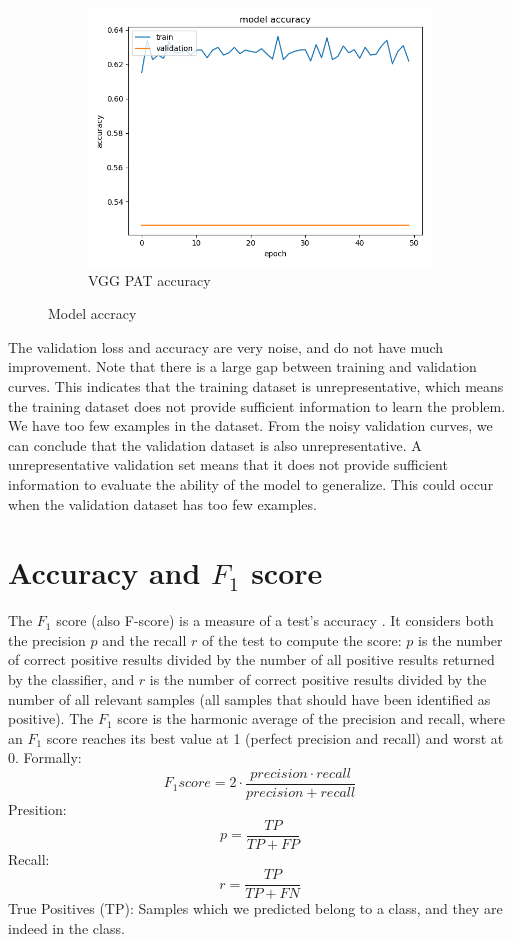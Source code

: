 \begin{figure}[h]
\begin{subfigure}[b]{.3\linewidth}
\includegraphics[width=\linewidth]{Figs/vgg_pat_acc.jpg}
\caption{VGG PAT accuracy}
\end{subfigure}
\caption{Model accracy}
\label{fig:acc}
\end{figure}

The validation loss and accuracy are very noise, and do not have much improvement. Note that there is a large gap between training and validation curves. This indicates that the training dataset is unrepresentative, which means the training dataset does not provide sufficient information to learn the problem. We have too few examples in the dataset. From the noisy validation curves, we can conclude that the validation dataset is also unrepresentative. A  unrepresentative validation set means that it does not provide sufficient information to evaluate the ability of the model to generalize. This could occur when the validation dataset has too few examples.

\section{Accuracy and $F_1$ score}
The $F_1$ score (also F-score) is a measure of a test's accuracy \citep{powers2011evaluation}. It considers both the precision $p$ and the recall $r$ of the test to compute the score: $p$ is the number of correct positive results divided by the number of all positive results returned by the classifier, and $r$ is the number of correct positive results divided by the number of all relevant samples (all samples that should have been identified as positive). The $F_1$ score is the harmonic average of the precision and recall, where an $F_1$ score reaches its best value at 1 (perfect precision and recall) and worst at 0.
Formally: $$F_1 score = 2 \cdot \frac{precision \cdot recall}{precision + recall}$$
Presition: $$p = \frac{TP}{TP + FP}$$
Recall: $$r = \frac{TP}{TP + FN}$$
\noindent True Positives (TP): Samples which we predicted belong to a class, and they are indeed in the class.

